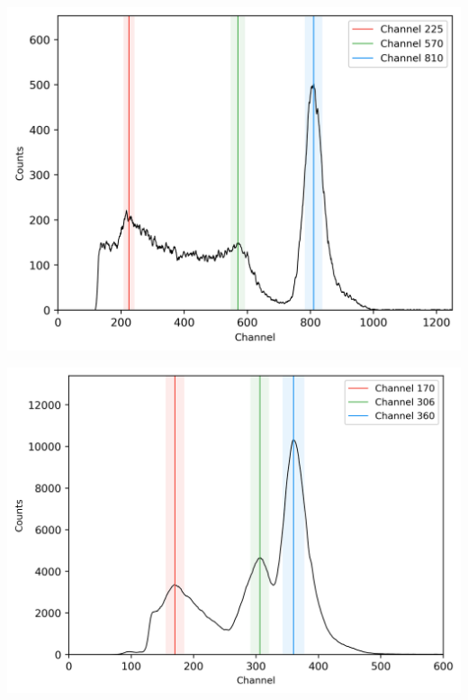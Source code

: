 %
\begin{center}
    \begin{adjustbox}{max width=\linewidth, keepaspectratio}
        \includegraphics[]{png/54Mn}
    \end{adjustbox}
    \label{fig:}
\end{center}
%
\begin{center}
    \begin{adjustbox}{max width=\linewidth, keepaspectratio}
        \includegraphics[]{png/133Ba}
    \end{adjustbox}
    \label{fig:}
\end{center}
%
